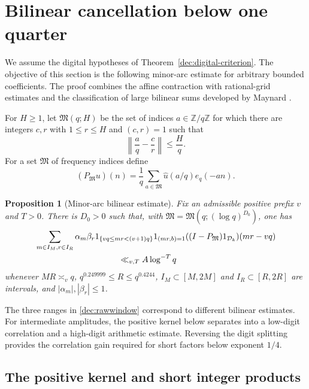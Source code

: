 \documentclass[11pt,a4paper]{article}
\theoremstyle{paperplain}
\newtheorem{proposition}[theorem]{Proposition}
\numberwithin{equation}{section}
\begin{document}
\section{Bilinear cancellation below one quarter}
\label{dec:bilinear-section}

We assume the digital hypotheses of Theorem~\ref{dec:digital-criterion}.
The objective of this section is the following minor-arc estimate for
arbitrary bounded coefficients. The proof combines the affine contraction
with rational-grid estimates and the classification of large bilinear
sums developed by Maynard \cite[Sections 10, 13--15]{Maynard2019}.

For $H\ge1$, let $\mathfrak M(q;H)$ be the set of indices
$a\in\mathbb Z/q\mathbb Z$ for which there are integers $c,r$ with
$1\le r\le H$ and $(c,r)=1$ such that
\[
 \left\|\frac aq-\frac cr\right\|\le\frac Hq.
\]
For a set $\mathfrak M$ of frequency indices define
\[
 (P_{\mathfrak M}u)(n)
 =\frac1q\sum_{a\in\mathfrak M}\widehat u(a/q)e_q(-an).
\]

\begin{proposition}[Minor-arc bilinear estimate]\label{dec:minorarc}
Fix an admissible positive prefix $v$ and $T>0$.
There is $D_0>0$ such that, with
$\mathfrak M=\mathfrak M(q;(\log q)^{D_0})$, one has
\begin{equation}\label{dec:minorarcII}
 \begin{split}
 &\sum_{m\in I_M,r\in I_R}\alpha_m\beta_r
 1_{\{vq\le mr<(v+1)q\}}1_{(mr,b)=1}
 ((I-P_{\mathfrak M})1_{\mathcal D_k})(mr-vq)\\
 &\hspace{35mm}\ll_{v,T}A\log^{-T}q
 \end{split}
\end{equation}
whenever $MR\asymp_vq$, $q^{0.249999}\le R\le q^{0.4244}$,
$I_M\subset[M,2M]$ and $I_R\subset[R,2R]$ are intervals, and
$|\alpha_m|,|\beta_r|\le1$.
\end{proposition}

The three ranges in \eqref{dec:rawwindow} correspond to different
bilinear estimates. For intermediate amplitudes, the positive kernel
below separates into a low-digit correlation and a high-digit
arithmetic estimate. Reversing the digit splitting provides the
correlation gain required for short factors below exponent $1/4$.

\subsection{The positive kernel and short integer products}
\label{dec:shortproduct}
\end{document}
